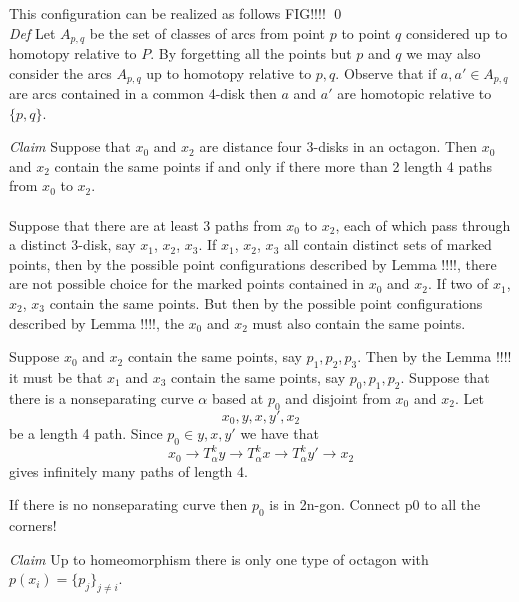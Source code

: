 \documentclass[11pt]{article}
\theoremstyle{remark}
\theoremstyle{definition}
\begin{document}
This configuration can be realized as follows
FIG!!!!
\qed\\




\emph{Def}
Let $A_{p,q}$
be the set of classes of arcs from point $p$
to point $q$ considered up to homotopy relative to $P$.
By forgetting all the points but $p$ and $q$
we may also consider the arcs $A_{p,q}$
up to homotopy relative to ${p,q}$.
Observe that if $a, a' \in A_{p,q}$
are arcs contained in a common 4-disk then $a$ and $a'$ are homotopic relative to $\{p,q\}$.

\vspace{1cm}

\emph{Claim} Suppose that $x_0$ and $x_2$ are distance four
3-disks in an octagon.
Then $x_0$ and $x_2$ contain the same points
if and only if there more than 2 length 4 paths from $x_0$ to $x_2$.\\
\\
Suppose that there are at least 3 paths from $x_0$ to $x_2$,
each of which pass through a distinct 3-disk, say $x_1$, $x_2$, $x_3$.
If $x_1$, $x_2$, $x_3$ all contain distinct sets of marked points,
then by the possible point configurations
described by Lemma !!!!, there are not possible choice for the
marked points contained in $x_0$ and $x_2$.
If two of  $x_1$, $x_2$, $x_3$ contain the same points.
But then by the possible point configurations
described by Lemma !!!!, the $x_0$ and $x_2$ must also contain the same points.

Suppose $x_0$ and $x_2$ contain the same points, say $p_1,p_2,p_3$.
Then by the Lemma !!!!
it must be that $x_1$ and $x_3$ contain the same points,
say $p_0,p_1,p_2$.
Suppose that there is a nonseparating curve $\alpha$ based at $p_0$
and disjoint from $x_0$ and $x_2$.
Let $$x_0,y,x,y',x_2$$ be a length 4 path.
Since $p_0 \in y,x,y'$
we have that
$$x_0 \to T^k_\alpha y \to T^k_\alpha x \to T^k_\alpha y'\to x_2$$
gives infinitely many paths of length 4.

If there is no nonseparating curve then $p_0$ is in 2n-gon. Connect p0 to all the corners!





 \emph{Claim}
 Up to homeomorphism
 there is only one
 type of octagon with $p(x_i) =\{p_j\}_{j \neq i}$.\\
 \\
\end{document}
